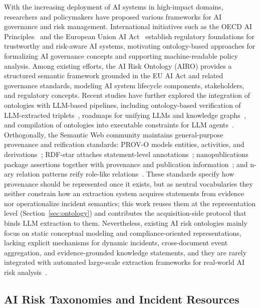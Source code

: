 \documentclass[a4paper,fleqn]{cas-dc}
\begin{document}
With the increasing deployment of AI systems in high-impact domains, researchers
and policymakers have proposed various frameworks for AI governance and risk
management.
International initiatives such as the OECD AI
Principles~\cite{oecd2019ai} and the European Union AI
Act~\cite{euaiact2024} establish regulatory foundations for trustworthy
and risk-aware AI systems, motivating ontology-based approaches for
formalizing AI governance concepts and supporting machine-readable
policy analysis.
Among existing efforts, the AI Risk Ontology (AIRO) provides a structured
semantic framework grounded in the EU AI Act and related governance
standards, modeling AI system lifecycle components, stakeholders, and
regulatory concepts.
Recent studies have further explored the integration of ontologies with
LLM-based pipelines, including ontology-based verification of
LLM-extracted triplets~\cite{chepurova-etal-2024-prompt}, roadmaps
for unifying LLMs and knowledge graphs~\cite{10387715}, and
compilation of ontologies into executable constraints for LLM
agents~\cite{Zhou_2026}.
Orthogonally, the Semantic Web community maintains general-purpose
provenance and reification standards: PROV-O models entities,
activities, and derivations~\cite{lebo2013prov}; RDF-star attaches
statement-level annotations~\cite{hartig2021rdfstar};
nanopublications package assertions together with provenance and
publication information~\cite{groth2010nanopublications}; and n-ary
relation patterns reify role-like relations~\cite{noy2006nary,gangemi2009ontology}.
These standards specify how provenance should be represented once it
exists, but as neutral vocabularies they neither constrain how an
extraction system acquires statements from evidence nor operationalize
incident semantics; this work reuses them at the representation level
(Section~\ref{sec:ontology}) and contributes the acquisition-side
protocol that binds LLM extraction to them.
Nevertheless, existing AI risk ontologies mainly focus on static conceptual
modeling and compliance-oriented representations, lacking explicit
mechanisms for dynamic incidents, cross-document event aggregation,
and evidence-grounded knowledge statements, and they are rarely
integrated with automated large-scale extraction frameworks for
real-world AI risk analysis~\cite{airo2022}.

\subsection{AI Risk Taxonomies and Incident Resources}
\end{document}
